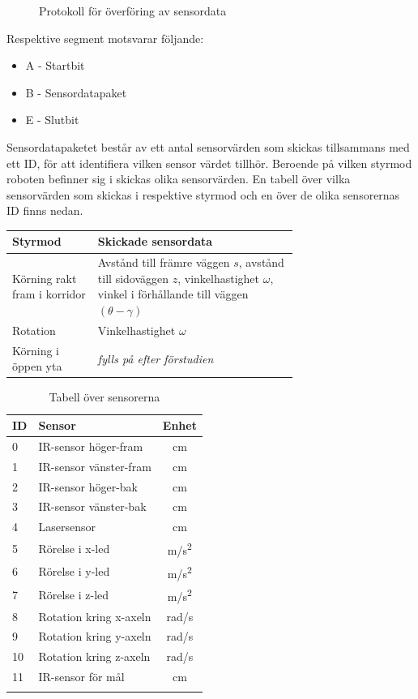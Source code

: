 \documentclass[11pt]{article}
\begin{document}
\begin{flushleft}
 \begin{figure}[H]
\centering
\noindent\resizebox{.8\linewidth}{!}{
	}
	\caption{Protokoll för överföring av sensordata\label{sensordata}}	
\end{figure} 

Respektive segment motsvarar följande: 
\begin{itemize}
	\item A - Startbit
	\item B - Sensordatapaket
	\item E - Slutbit
\end{itemize}

Sensordatapaketet består av ett antal sensorvärden som skickas tillsammans med ett ID, för att identifiera vilken sensor värdet tillhör. Beroende på vilken styrmod roboten befinner sig i skickas olika sensorvärden. En tabell över vilka sensorvärden som skickas i respektive styrmod och en över de olika sensorernas ID finns nedan.

\begin{table}
\begin{tabular}[l]{| l | p{0.7\linewidth} |} \hline
\textbf{Styrmod} & \textbf{Skickade sensordata} \\ \hline 
Körning rakt fram i korridor & Avstånd till främre väggen $s$, avstånd till sidoväggen $z$, vinkelhastighet $\omega$, vinkel i förhållande till väggen $(\theta-\gamma)$ \\ \hline
Rotation & Vinkelhastighet $\omega$ \\ \hline
Körning i öppen yta & \textit{fylls på efter förstudien} \\ \hline
\end{tabular}
\end{table}


\begin{longtable}[l]{| l | l | c |} \hline
\textbf{ID} & \textbf{Sensor} & \textbf{Enhet} \\ \hline 
0 & IR-sensor höger-fram & cm \\ \hline
1 & IR-sensor vänster-fram  & cm \\ \hline
2 & IR-sensor höger-bak  & cm  \\ \hline
3 & IR-sensor vänster-bak  &  cm \\ \hline
4 & Lasersensor & cm  \\ \hline
5 & Rörelse i x-led & m/s\textsuperscript{2} \\ \hline
6 & Rörelse i y-led & m/s\textsuperscript{2} \\ \hline
7 & Rörelse i z-led & m/s\textsuperscript{2} \\ \hline
8 & Rotation kring x-axeln & rad/s \\ \hline
9 & Rotation kring y-axeln & rad/s \\ \hline
10 & Rotation kring z-axeln & rad/s \\ \hline
11 & IR-sensor för mål & cm \\ \hline
\caption{Tabell över sensorerna}
\end{longtable}



\end{flushleft}
\end{document}

